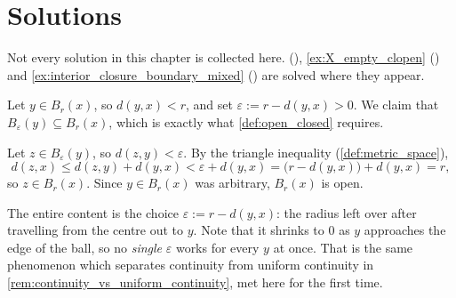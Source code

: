 
\section{Solutions}
\label{sec:open_closed_solutions}

Not every solution in this chapter is collected here. 
(), \cref{ex:X_empty_clopen}
() and \cref{ex:interior_closure_boundary_mixed}
() are solved where they appear.

\begin{exercisesolution}
\label{sol:ai_open_balls_are_open}
Let $y \in B_r(x)$, so $d(y,x) < r$, and set $\varepsilon := r - d(y,x) > 0$. We claim that
$B_\varepsilon(y) \subseteq B_r(x)$, which is exactly what \cref{def:open_closed} requires.

Let $z \in B_\varepsilon(y)$, so $d(z,y) < \varepsilon$. By the triangle inequality
(\cref{def:metric_space}),
\[d(z,x) \leq d(z,y) + d(y,x) < \varepsilon + d(y,x) = \big(r-d(y,x)\big) + d(y,x) = r,\]
so $z \in B_r(x)$. Since $y \in B_r(x)$ was arbitrary, $B_r(x)$ is open.

\begin{remark}
The entire content is the choice $\varepsilon := r - d(y,x)$: the radius left over after
travelling from the centre out to $y$. Note that it shrinks to $0$ as $y$ approaches the edge of
the ball, so no \emph{single} $\varepsilon$ works for every $y$ at once. That is the same
 phenomenon which separates continuity from uniform
continuity in \cref{rem:continuity_vs_uniform_continuity}, met here for the first time.
\end{remark}
\end{exercisesolution}

